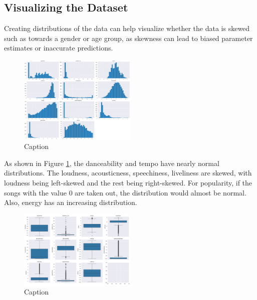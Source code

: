 \documentclass[times, twocolumn]{article}
\begin{document}
\subsection{Visualizing the Dataset}
Creating distributions of the data can help visualize whether the data is skewed such as towards a gender or age group, as skewness can lead to biased parameter estimates or inaccurate predictions.

\begin{figure}[H]
    \centering
    \begin{minipage}{1\textwidth}
        \includegraphics[width=0.5\textwidth]{feature_dists.png}
        \caption{Caption}
        \label{graph:dists}
    \end{minipage}%
\end{figure}

As shown in Figure \ref{graph:dists}, the danceability and tempo have nearly normal distributions. The loudness, acousticness, speechiness, liveliness are skewed, with loudness being left-skewed and the rest being right-skewed. For popularity, if the songs with the value 0 are taken out, the distribution would almost be normal. Also, energy has an increasing distribution.

\begin{figure}[H]
    \centering
    \begin{minipage}{1\textwidth}
        \includegraphics[width=0.5\textwidth]{feat_boxplots.png}
        \caption{Caption}
        \label{Boxplots}
    \end{minipage}%
\end{figure}
\end{document}
